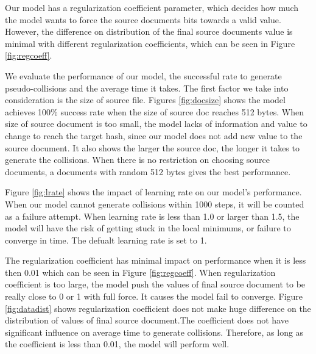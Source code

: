 \documentclass{article}
\begin{document}
Our model has a regularization coefficient parameter, which decides how much the model wants to force the source documents bits towards a valid value. However, the difference on distribution of the final source documents value is minimal with different regularization coefficients, which can be seen in Figure \ref{fig:regcoeff}.

We evaluate the performance of our model, the successful rate to generate pseudo-collisions and  the average time it takes. The first factor we take into consideration is the size of source file. Figures \ref{fig:docsize} shows the model achieves 100\% success rate when the size of source doc reaches 512 bytes. When size of source document is too small, the model lacks of information and value to change to reach the target hash, since our model does not add new value to the source document. It also shows the larger the source doc, the longer it takes to generate the collisions. When there is no restriction on choosing source documents, a documents with random 512 bytes gives the best performance.

Figure \ref{fig:lrate} shows the impact of learning rate on our model's performance. When our model cannot generate collisions within 1000 steps, it will be counted as a failure attempt. When learning rate is less than 1.0 or larger than 1.5, the model will have the risk of getting stuck in the local minimums, or failure to converge in time. The defualt learning rate is set to 1.

The regularization coefficient has minimal impact on performance when it is less then 0.01 which can be seen in Figure \ref{fig:regcoeff}. When regularization coefficient is too large, the model push the values of final source document to be really close to 0 or 1 with full force. It causes the model fail to converge. Figure \ref{fig:datadist} shows regularization coefficient does not make huge difference on the distribution of values of final source document.The coefficient does not have significant influence on average time to generate collisions. Therefore, as long as the coefficient is less than 0.01, the model will perform well.
\end{document}
